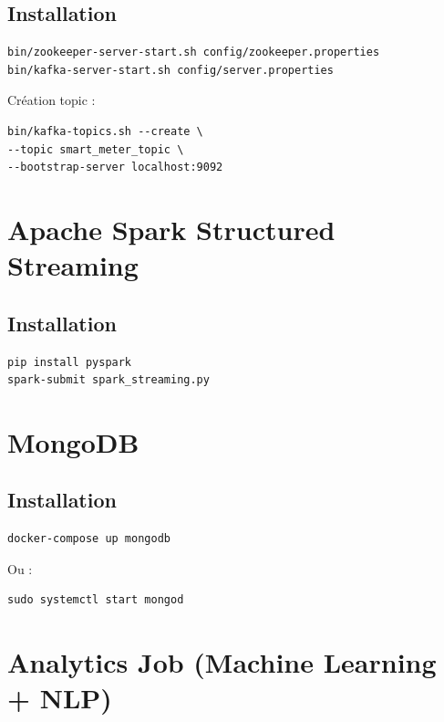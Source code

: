 \documentclass[1pt,a4paper]{report}
\begin{document}
\subsection{Installation}

\begin{verbatim}
bin/zookeeper-server-start.sh config/zookeeper.properties
bin/kafka-server-start.sh config/server.properties
\end{verbatim}

Création topic :

\begin{verbatim}
bin/kafka-topics.sh --create \
--topic smart_meter_topic \
--bootstrap-server localhost:9092
\end{verbatim}

\section{Apache Spark Structured Streaming}

\subsection{Installation}

\begin{verbatim}
pip install pyspark
spark-submit spark_streaming.py
\end{verbatim}

\section{MongoDB}

\subsection{Installation}

\begin{verbatim}
docker-compose up mongodb
\end{verbatim}

Ou :

\begin{verbatim}
sudo systemctl start mongod
\end{verbatim}

\section{Analytics Job (Machine Learning + NLP)}
\end{document}

